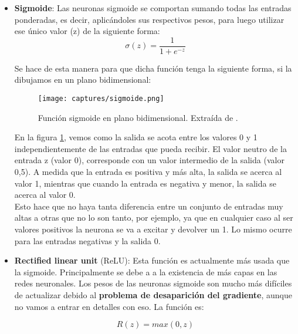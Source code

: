 \documentclass[11pt,fleqn]{book} %
\begin{document}
\begin{itemize}
	\item \textbf{Sigmoide}: Las neuronas sigmoide se comportan sumando todas las entradas ponderadas, es decir, aplicándoles sus respectivos pesos, para luego utilizar ese único valor (z) de la siguiente forma: 
	\begin{equation}
	\sigma(z) = \frac{1}{1+e^{-z}}
	\end{equation}
	
	Se hace de esta manera para que dicha función tenga la siguiente forma, si la dibujamos en un plano bidimensional:
	
	\begin{figure}[H]
		\centering\texttt{[image: captures/sigmoide.png]}
		\caption{Función sigmoide en plano bidimensional. Extraída de \cite{article:redNeuronal2}.}
		\label{fig:sigmoide} %
	\end{figure}

	En la figura \ref{fig:sigmoide}, vemos como la salida se acota entre los valores 0 y 1 independientemente de las entradas que pueda recibir. El valor neutro de la entrada z (valor 0), corresponde con un valor intermedio de la salida (valor 0,5). A medida que la entrada es positiva y más alta, la salida se acerca al valor 1, mientras que cuando la entrada es negativa y menor, la salida se acerca al valor 0. \\
	
	Esto hace que no haya tanta diferencia entre un conjunto de entradas muy altas a otras que no lo son tanto, por ejemplo, ya que en cualquier caso al ser valores positivos la neurona se va a excitar y devolver un 1. Lo mismo ocurre para las entradas negativas y la salida 0. \\
	
	\item \textbf{Rectified linear unit} (ReLU): Esta función es actualmente más usada que la sigmoide. Principalmente se debe a a la existencia de más capas en las redes neuronales. Los pesos de las neuronas sigmoide son mucho más difíciles de actualizar debido al \textbf{problema de desaparición del gradiente}, aunque no vamos a entrar en detalles con eso. La función es:
	
	\begin{equation}
	R(z) = max(0,z)
	\end{equation}
	

\end{itemize}
\end{document}
